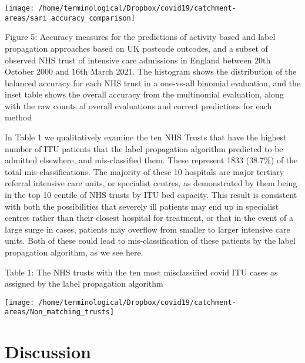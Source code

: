 \documentclass[
]{article}
\begin{document}
\begin{center}\texttt{[image: /home/terminological/Dropbox/covid19/catchment-areas/sari\_accuracy\_comparison]} \end{center}

Figure 5: Accuracy measures for the predictions of activity based and
label propagation approaches based on UK postcode outcodes, and a subset
of observed NHS trust of intensive care admissions in England between
20th October 2000 and 16th March 2021. The histogram shows the
distribution of the balanced accuracy for each NHS trust in a one-vs-all
binomial evaluation, and the inset table shows the overall accuracy from
the multinomial evaluation, along with the raw counts af overall
evaluations and correct predictions for each method

In Table 1 we qualitatively examine the ten NHS Trusts that have the
highest number of ITU patients that the label propagation algorithm
predicted to be admitted elsewhere, and mis-classified them. These
represent 1833 (38.7\%) of the total mis-classifications. The majority
of these 10 hospitals are major tertiary referral intensive care units,
or specialist centres, as demonstrated by them being in the top 10
centile of NHS trusts by ITU bed capacity. This result is consistent
with both the possibilities that severely ill patients may end up in
specialist centres rather than their closest hospital for treatment, or
that in the event of a large surge in cases, patients may overflow from
smaller to larger intensive care units. Both of these could lead to
mis-classification of these patients by the label propagation algorithm,
as we see here.

Table 1: The NHS trusts with the ten most misclassified covid ITU cases
as assigned by the label propagation algorithm

\begin{center}\texttt{[image: /home/terminological/Dropbox/covid19/catchment-areas/Non\_matching\_trusts]} \end{center}

\hypertarget{discussion}{%
\section{Discussion}\label{discussion}}
\end{document}
